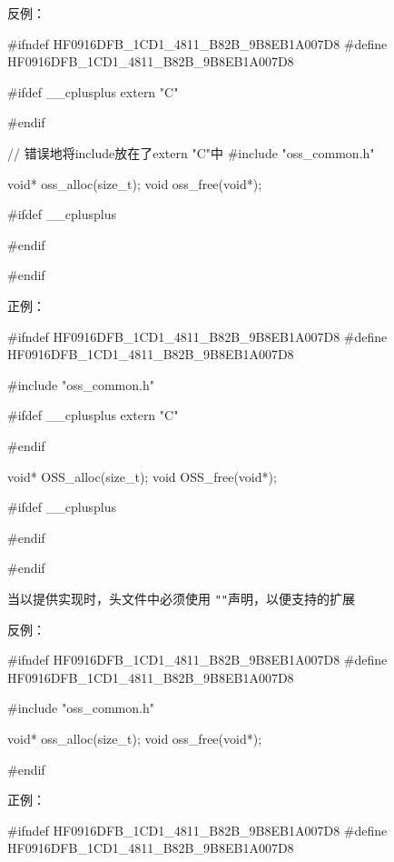 \begin{content}
反例：
\begin{leftbar}
\begin{c++}[caption={oss/oss\_memery.h}]
#ifndef HF0916DFB_1CD1_4811_B82B_9B8EB1A007D8
#define HF0916DFB_1CD1_4811_B82B_9B8EB1A007D8
    
#ifdef  __cplusplus
extern "C" {
#endif

// 错误地将include放在了extern "C"中
#include "oss_common.h"

void* oss_alloc(size_t);
void  oss_free(void*);

#ifdef  __cplusplus
}
#endif

#endif
\end{c++}
\end{leftbar}

正例：
\begin{leftbar}
\begin{c++}[caption={oss/oss\_memery.h}]
#ifndef HF0916DFB_1CD1_4811_B82B_9B8EB1A007D8
#define HF0916DFB_1CD1_4811_B82B_9B8EB1A007D8
    
#include "oss_common.h"

#ifdef  __cplusplus
extern "C" {
#endif

void* OSS_alloc(size_t);
void  OSS_free(void*);

#ifdef  __cplusplus
}
#endif

#endif
\end{c++}
\end{leftbar}

\begin{regulation}
当以\clang{}提供实现时，头文件中必须使用
\texttt{"}\texttt{"}声明，以便支持\cpp{}的扩展
\end{regulation}

反例：
\begin{leftbar}
\begin{c++}[caption={oss/oss\_memery.h}]
#ifndef HF0916DFB_1CD1_4811_B82B_9B8EB1A007D8
#define HF0916DFB_1CD1_4811_B82B_9B8EB1A007D8    

#include "oss_common.h"

void* oss_alloc(size_t);
void  oss_free(void*);

#endif
\end{c++}
\end{leftbar}

正例：
\begin{leftbar}
\begin{c++}[caption={oss/oss\_memery.h}]
#ifndef HF0916DFB_1CD1_4811_B82B_9B8EB1A007D8
#define HF0916DFB_1CD1_4811_B82B_9B8EB1A007D8    


\end{c++}
\end{leftbar}
\end{content}
